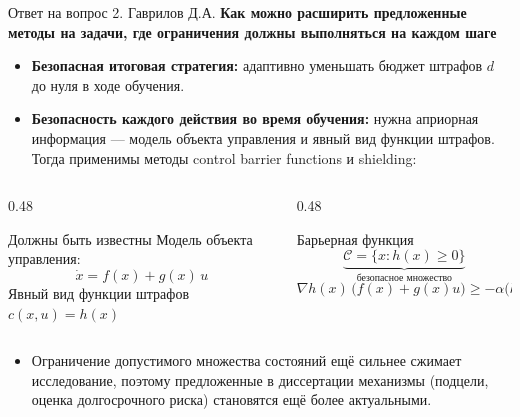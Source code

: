 
\begin{frame}[noframenumbering,shrink=5]{Ответ на вопрос 2. Гаврилов Д.А.}
    \small
    \textbf{Как можно расширить предложенные методы на задачи, где ограничения должны выполняться на каждом шаге}

    \vspace{0.3em}
    \begin{itemize}
        \item \textbf{Безопасная итоговая стратегия:} адаптивно уменьшать
              бюджет штрафов $d$ до нуля в ходе обучения.
        \item \textbf{Безопасность каждого действия во время обучения:} нужна
              априорная информация --- модель объекта управления и явный вид
              функции штрафов. Тогда применимы методы control barrier
              functions и shielding:
    \end{itemize}
    \vspace{-0.3em}
    \begin{columns}[T,onlytextwidth]
        \begin{column}{0.48\textwidth}
            \begin{block}{Должны быть известны}
                Модель объекта управления:
                \[
                    \dot{x} = f(x) + g(x)\,u
                \]
                Явный вид функции штрафов $c(x, u) = h(x)$
            \end{block}
        \end{column}
        \begin{column}{0.48\textwidth}
            \begin{block}{Барьерная функция}
                \[
                    \underbrace{\mathcal{C} = \{x : h(x) \ge 0\}}_{\text{безопасное множество}}
                \]
                \[
                    \nabla h(x)\,\big(f(x) + g(x)u\big)
                    \ge -\alpha\big(h(x)\big)
                \]
            \end{block}
        \end{column}
    \end{columns}
    \vspace{0.3em}
    \begin{itemize}
        \item Ограничение допустимого множества состояний ещё сильнее сжимает
              исследование, поэтому предложенные в диссертации механизмы
              (подцели, оценка долгосрочного риска) становятся ещё более
              актуальными.
    \end{itemize}
\end{frame}

